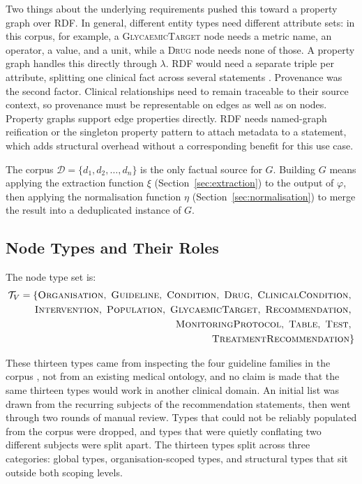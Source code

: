 Two things about the underlying requirements pushed this toward a property graph over RDF. In general, different entity types need different attribute sets: in this corpus, for example, a \textsc{GlycaemicTarget} node needs a metric name, an operator, a value, and a unit, while a \textsc{Drug} node needs none of those. A property graph handles this directly through $\lambda$. RDF would need a separate triple per attribute, splitting one clinical fact across several statements \cite{barrasa2023}. Provenance was the second factor. Clinical relationships need to remain
traceable to their source context, so provenance must be representable on
edges as well as on nodes. Property graphs support edge properties directly. RDF needs named-graph reification or the singleton property pattern to attach metadata to a statement, which adds structural overhead without a corresponding benefit for this use case.

The corpus $\mathcal{D} = \{d_1, d_2, \ldots, d_n\}$ is the only factual source for $G$. Building $G$ means applying the extraction function $\xi$ (Section~\ref{sec:extraction}) to the output of $\varphi$, then applying the normalisation function $\eta$ (Section~\ref{sec:normalisation}) to merge the result into a deduplicated instance of $G$.

\subsection{Node Types and Their Roles}
\label{sec:node-types}

The node type set is:
\begin{align*}
\mathcal{T}_V = \{\textsc{Organisation},\ \textsc{Guideline},\ 
\textsc{Condition},\ \textsc{Drug},\ \textsc{ClinicalCondition},\ \\
\textsc{Intervention},\ \textsc{Population},\ \textsc{GlycaemicTarget},\
\textsc{Recommendation},\ \\ \textsc{MonitoringProtocol},\ 
\textsc{Table},\ \textsc{Test},\ \\ \textsc{TreatmentRecommendation}\}
\end{align*}

These thirteen types came from inspecting the four guideline families in the corpus \cite{ADA2026,NICE_T2_2026,IDF2025,CanadaDiabetes_Ch3}, not from an existing medical ontology, and no claim is made that the same thirteen types would work in another clinical domain. An initial list was drawn from the recurring subjects of the recommendation statements, then went through two rounds of manual review. Types that could not be reliably populated from the corpus were dropped, and types that were quietly conflating two different subjects were split apart. The thirteen types split across three categories: global types,
organisation-scoped types, and structural types that sit outside both
scoping levels.

